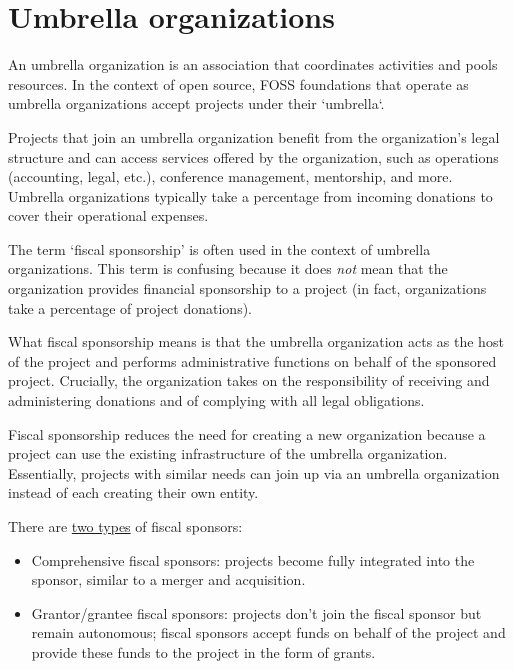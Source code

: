


\chapter{Umbrella organizations}

An umbrella organization is an association that coordinates activities and pools resources.  In the context of open source, FOSS foundations that operate as umbrella organizations accept projects under their `umbrella`.

Projects that join an umbrella organization benefit from the organization's legal structure and can access services offered by the organization, such as operations (accounting, legal, etc.), conference management, mentorship, and more.  Umbrella organizations typically take a percentage from incoming donations to cover their operational expenses.

The term `fiscal sponsorship' is often used in the context of umbrella organizations.  This term is confusing because it does \textit{not} mean that the organization provides financial sponsorship to a project (in fact, organizations take a percentage of project donations).

What fiscal sponsorship means is that the umbrella organization acts as the host of the project and performs administrative functions on behalf of the sponsored project.  Crucially, the organization takes on the responsibility of receiving and administering donations and of complying with all legal obligations.

Fiscal sponsorship reduces the need for creating a new organization because a project can use the existing infrastructure of the umbrella organization.  Essentially, projects with similar needs can join up via an umbrella organization instead of each creating their own entity.

There are \href{https://lwn.net/Articles/548542/}{two types} of fiscal sponsors:

\begin{itemize}

\item Comprehensive fiscal sponsors: projects become fully integrated into the sponsor, similar to a merger and acquisition.

\item Grantor/grantee fiscal sponsors: projects don't join the fiscal sponsor but remain autonomous; fiscal sponsors accept funds on behalf of the project and provide these funds to the project in the form of grants.

\end{itemize}

